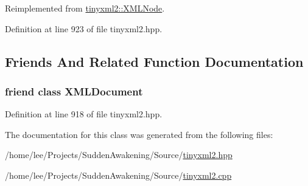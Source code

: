 Reimplemented from \hyperlink{classtinyxml2_1_1_x_m_l_node_aedae0bbb58d533a4b8a61042388b49e5}{tinyxml2\-::\-X\-M\-L\-Node}.



Definition at line 923 of file tinyxml2.\-hpp.



\subsection{Friends And Related Function Documentation}
\hypertarget{classtinyxml2_1_1_x_m_l_declaration_a4eee3bda60c60a30e4e8cd4ea91c4c6e}{
\subsubsection[{X\-M\-L\-Document}]{\setlength{\rightskip}{0pt plus 5cm}friend class {\bf X\-M\-L\-Document}\hspace{0.3cm}{\ttfamily [friend]}}}\label{classtinyxml2_1_1_x_m_l_declaration_a4eee3bda60c60a30e4e8cd4ea91c4c6e}


Definition at line 918 of file tinyxml2.\-hpp.



The documentation for this class was generated from the following files\-:\begin{DoxyCompactItemize}
\item 
/home/lee/\-Projects/\-Sudden\-Awakening/\-Source/\hyperlink{tinyxml2_8hpp}{tinyxml2.\-hpp}\item 
/home/lee/\-Projects/\-Sudden\-Awakening/\-Source/\hyperlink{tinyxml2_8cpp}{tinyxml2.\-cpp}\end{DoxyCompactItemize}
